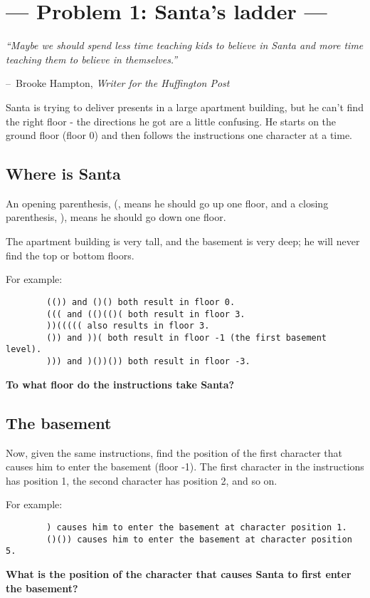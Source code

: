 \documentclass[12pt]{article}
\makeatletter
\newenvironment{chapquote}[2][2em]
  {\setlength{\@tempdima}{#1}%
   \def\chapquote@author{#2}%
   \parshape 1 \@tempdima \dimexpr\textwidth-2\@tempdima\relax%
   \itshape}
  {\par\normalfont\hfill--\ \chapquote@author\hspace*{\@tempdima}\par\bigskip}
\makeatother
\begin{document}
 
\lstset{language=python}

\section*{\hfil--- Problem 1: Santa's ladder ---\hfil}

 	\begin{chapquote}{Brooke Hampton, \textit{Writer for the Huffington Post}}
 	``Maybe we should spend less time teaching kids to believe in Santa and more time teaching them to believe in themselves.''
 	\end{chapquote}


    Santa is trying to deliver presents in a large apartment building, but he can't find the right floor - the directions he got are a little confusing. He starts on the ground floor (floor 0) and then follows the instructions one character at a time.


	\subsection* {Where is Santa}

    An opening parenthesis, (, means he should go up one floor, and a closing parenthesis, ), means he should go down one floor.
    
    The apartment building is very tall, and the basement is very deep; he will never find the top or bottom floors.
    
    For example:
    
    \begin{lstlisting}
        (()) and ()() both result in floor 0.
        ((( and (()(()( both result in floor 3.
        ))((((( also results in floor 3.
        ()) and ))( both result in floor -1 (the first basement level).
        ))) and )())()) both result in floor -3.
    \end{lstlisting}
    
    \textbf{To what floor do the instructions take Santa?}  

	\subsection* {The basement}

    Now, given the same instructions, find the position of the first character that causes him to enter the basement (floor -1). The first character in the instructions has position 1, the second character has position 2, and so on.
    
    For example:
    
    \begin{lstlisting}
        ) causes him to enter the basement at character position 1.
        ()()) causes him to enter the basement at character position 5. 
    \end{lstlisting}
    
    \textbf{What is the position of the character that causes Santa to first enter the basement?}  
    
\end{document}
